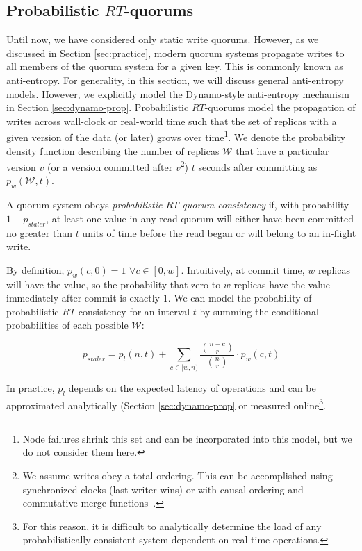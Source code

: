 \documentclass{vldb}
\begin{document}
\subsection{Probabilistic $RT$-quorums}

Until now, we have considered only static write quorums.  However, as
we discussed in Section \ref{sec:practice}, modern quorum systems
propagate writes to all members of the quorum system for a given key.
This is commonly known as anti-entropy.  For generality, in this
section, we will discuss general anti-entropy models. However, we
explicitly model the Dynamo-style anti-entropy mechanism in Section
\ref{sec:dynamo-prop}.  Probabilistic $RT$-quorums model the
propagation of writes across wall-clock or real-world time such that
the set of replicas with a given version of the data (or later) grows
over time\footnote{Node failures shrink this set and can be
  incorporated into this model, but we do not consider them here.}.
We denote the probability density function describing the number of
replicas $\mathcal{W}$ that have a particular version $v$ (or a
version committed after $v$\footnote{We assume writes obey a total
  ordering. This can be accomplished using synchronized clocks (last
  writer wins) or with causal ordering and commutative merge
  functions~\cite{cops}.}) $t$ seconds after committing as
$p_w(\mathcal{W}, t)$.

\begin{definition}
A quorum system obeys \textit{probabilistic $RT$-quorum consistency}
if, with probability $1-p_{staler}$, at least one value in any read
quorum will either have been committed no greater than $t$ units of
time before the read began or will belong to an in-flight write.
\end{definition}

By definition, $p_w(c,0) = 1$ $\forall c \in [0, w]$.  Intuitively, at
commit time, $w$ replicas will have the value, so the probability that
zero to $w$ replicas have the value immediately after commit is
exactly $1$.  We can model the probability of probabilistic $RT$-consistency for an interval $t$ by summing the conditional probabilities of each possible $\mathcal{W}$:

\begin{equation}
p_{staler} = p_l(n, t)+\sum_{c\in[w, n)} \frac{{n-c \choose r}}{{n \choose r}}\cdot p_w(c, t)
\end{equation}

In practice, $p_l$ depends on the expected latency of operations and can be
approximated analytically (Section \ref{sec:dynamo-prop} or measured
online\footnote{For this reason, it is difficult to analytically
  determine the load of any probabilistically consistent system
  dependent on real-time operations.}.
\end{document}
